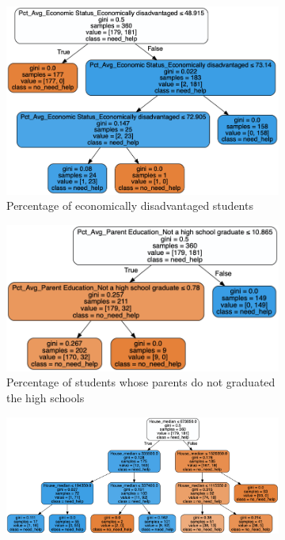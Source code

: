 \documentclass[11pt]{article}
\begin{document}
\begin{figure}[h!]
\centering
\begin{subfigure}{0.45\textwidth}
         \centering
         \includegraphics[width=\textwidth]{recom_economic_dis_rate.png}
         \caption{Percentage of economically disadvantaged students}
         \label{fig:dtree_specific_eco_disrate}
\end{subfigure}
\hfill
\begin{subfigure}{0.48\textwidth}
         \centering
         \includegraphics[width=\textwidth]{recom_edu_nothigh.png}
         \caption{Percentage of students whose parents do not graduated the high schools}
         \label{fig:dtree_specific_noghigh}
\end{subfigure}
\hfill
\begin{subfigure}{0.8\textwidth}
         \centering
         \includegraphics[width=\textwidth]{recom_house_median.png}

\end{subfigure}
\end{figure}
\end{document}
